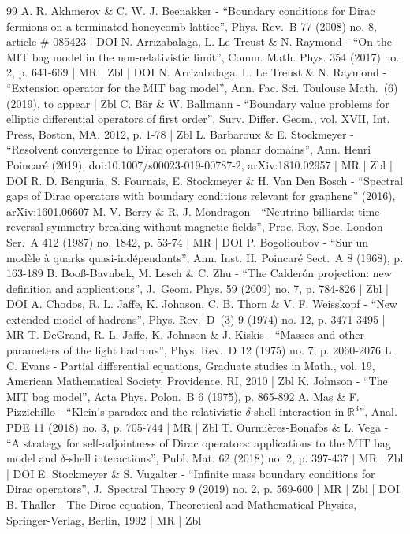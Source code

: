\documentclass[10pt]{amsart}
\theoremstyle{plain}
\theoremstyle{definition}
\begin{document}
\begin{thebibliography}{99}
A. R. Akhmerov \& C. W. J. Beenakker - “Boundary conditions for Dirac fermions on a terminated honeycomb lattice”, Phys. Rev. B 77 (2008) no. 8, article \# 085423 | DOI
N. Arrizabalaga, L. Le Treust \& N. Raymond - “On the MIT bag model in the non-relativistic limit”, Comm. Math. Phys. 354 (2017) no. 2, p. 641-669 | MR | Zbl | DOI
N. Arrizabalaga, L. Le Treust \& N. Raymond - “Extension operator for the MIT bag model”, Ann. Fac. Sci. Toulouse Math. (6) (2019), to appear | Zbl
C. Bär \& W. Ballmann - “Boundary value problems for elliptic differential operators of first order”, Surv. Differ. Geom., vol. XVII, Int. Press, Boston, MA, 2012, p. 1-78 | Zbl
L. Barbaroux \& E. Stockmeyer - “Resolvent convergence to Dirac operators on planar domains”, Ann. Henri Poincaré (2019), doi:10.1007/s00023-019-00787-2, arXiv:1810.02957 | MR | Zbl | DOI
R. D. Benguria, S. Fournais, E. Stockmeyer \& H. Van Den Bosch - “Spectral gaps of Dirac operators with boundary conditions relevant for graphene” (2016), arXiv:1601.06607
M. V. Berry \& R. J. Mondragon - “Neutrino billiards: time-reversal symmetry-breaking without magnetic fields”, Proc. Roy. Soc. London Ser. A 412 (1987) no. 1842, p. 53-74 | MR | DOI
P. Bogolioubov - “Sur un modèle à quarks quasi-indépendants”, Ann. Inst. H. Poincaré Sect. A 8 (1968), p. 163-189
B. Booß-Bavnbek, M. Lesch \& C. Zhu - “The Calderón projection: new definition and applications”, J. Geom. Phys. 59 (2009) no. 7, p. 784-826 | Zbl | DOI
A. Chodos, R. L. Jaffe, K. Johnson, C. B. Thorn \& V. F. Weisskopf - “New extended model of hadrons”, Phys. Rev. D (3) 9 (1974) no. 12, p. 3471-3495 | MR
T. DeGrand, R. L. Jaffe, K. Johnson \& J. Kiskis - “Masses and other parameters of the light hadrons”, Phys. Rev. D 12 (1975) no. 7, p. 2060-2076
L. C. Evans - Partial differential equations, Graduate studies in Math., vol. 19, American Mathematical Society, Providence, RI, 2010 | Zbl
K. Johnson - “The MIT bag model”, Acta Phys. Polon. B 6 (1975), p. 865-892
A. Mas \& F. Pizzichillo - “Klein’s paradox and the relativistic $\delta $-shell interaction in $\mathbb{R}^3$”, Anal. PDE 11 (2018) no. 3, p. 705-744 | MR | Zbl
T. Ourmières-Bonafos \& L. Vega - “A strategy for self-adjointness of Dirac operators: applications to the MIT bag model and $\delta $-shell interactions”, Publ. Mat. 62 (2018) no. 2, p. 397-437 | MR | Zbl | DOI
E. Stockmeyer \& S. Vugalter - “Infinite mass boundary conditions for Dirac operators”, J. Spectral Theory 9 (2019) no. 2, p. 569-600 | MR | Zbl | DOI
B. Thaller - The Dirac equation, Theoretical and Mathematical Physics, Springer-Verlag, Berlin, 1992 | MR | Zbl
\end{thebibliography}
\end{document}
